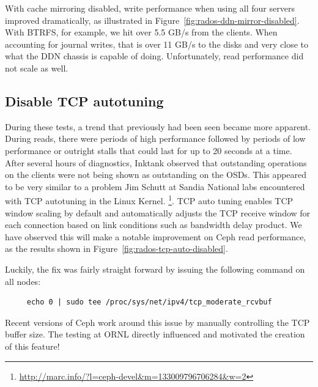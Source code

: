 \documentclass{article}
\begin{document}
With cache mirroring disabled, write performance when using all four servers
improved dramatically, as illustrated in
Figure~\ref{fig:rados-ddn-mirror-disabled}. With BTRFS, for example, we hit over
5.5 GB/s from the clients.  When accounting for journal writes, that is over
11 GB/s to the disks and very close to what the DDN chassis is capable of doing. 
Unfortunately, read performance did not scale as well.


\subsection{Disable TCP autotuning}

During these tests, a trend that previously had been seen became more apparent.
During reads, there were periods of high performance followed by periods of low
performance or outright stalls that could last for up to 20 seconds at a time. 
After several hours of diagnostics, Inktank observed that outstanding operations
on the clients were not being shown as outstanding on the OSDs.  This appeared
to be very similar to a problem Jim Schutt at Sandia National labs encountered
with TCP autotuning in the Linux Kernel.
\footnote{\url{http://marc.info/?l=ceph-devel&m=133009796706284&w=2}}.
TCP auto tuning enables TCP window scaling by default and automatically adjusts
the TCP receive window for each connection based on link conditions such as
bandwidth delay product. We have observed this will make a notable improvement
on Ceph read performance, as the results shown in
Figure~\ref{fig:rados-tcp-auto-disabled}.


Luckily, the fix was fairly straight forward by issuing the following command on all nodes:

\begin{Verbatim}
     echo 0 | sudo tee /proc/sys/net/ipv4/tcp_moderate_rcvbuf
\end{Verbatim}

Recent versions of Ceph work around this issue by manually controlling the TCP
buffer size.  The testing at ORNL directly influenced and motivated the creation
of this feature!
\end{document}
